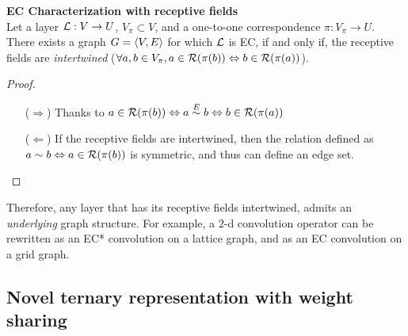 \begin{proposition}\textbf{EC Characterization with receptive fields}\\
Let a layer $\mathcal{L}: V \rightarrow U$, $V_\pi \subset V$, and a one-to-one correspondence $\pi: V_\pi \rightarrow U$. There exists a graph $G = \langle V, E \rangle$ for which $\mathcal{L}$ is EC, if and only if, the receptive fields are \emph{intertwined} (\ie $\forall a,b \in V_\pi, a \in \mathcal{R}(\pi(b)) \Leftrightarrow b \in \mathcal{R}(\pi(a)) $).
\label{prop:lrf}
\end{proposition}
\begin{proof}
\begin{enumerate}
  \item[($\Rightarrow$)] Thanks to $a \in \mathcal{R}(\pi(b)) \Leftrightarrow a \overset{E}\sim b \Leftrightarrow b \in \mathcal{R}(\pi(a))$
  \item[($\Leftarrow$)] If the receptive fields are intertwined, then the relation defined as\\ $a \sim b \Leftrightarrow a \in \mathcal{R}(\pi(b))$ is symmetric, and thus can define an edge set.
\end{enumerate}
\end{proof}

Therefore, any layer that has its receptive fields intertwined, admits an \emph{underlying} graph structure. For example, a $2$-d convolution operator can be rewritten as an EC* convolution on a lattice graph, and as an EC convolution on a grid graph.



\subsection{Novel ternary representation with weight sharing}
\label{sec:nct}

